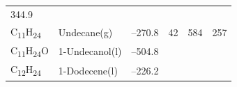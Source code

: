 \documentclass[
  9pt,
]{extbook}
\theoremstyle{definition}
\theoremstyle{definition}
\theoremstyle{definition}
\theoremstyle{remark}
\begin{document}
\begin{longtable}[]{@{}llllll@{}}
\begin{minipage}[t]{0.14\columnwidth}
344.9\strut
\end{minipage}\tabularnewline
\begin{minipage}[t]{0.07\columnwidth}\raggedright
C\textsubscript{11}H\textsubscript{24}\strut
\end{minipage} & \begin{minipage}[t]{0.17\columnwidth}\raggedright
Undecane(g)\strut
\end{minipage} & \begin{minipage}[t]{0.15\columnwidth}\raggedright
--270.8\strut
\end{minipage} & \begin{minipage}[t]{0.15\columnwidth}\raggedright
42\strut
\end{minipage} & \begin{minipage}[t]{0.14\columnwidth}\raggedright
584\strut
\end{minipage} & \begin{minipage}[t]{0.14\columnwidth}\raggedright
257\strut
\end{minipage}\tabularnewline
\begin{minipage}[t]{0.07\columnwidth}\raggedright
C\textsubscript{11}H\textsubscript{24}O\strut
\end{minipage} & \begin{minipage}[t]{0.17\columnwidth}\raggedright
1-Undecanol(l)\strut
\end{minipage} & \begin{minipage}[t]{0.15\columnwidth}\raggedright
--504.8\strut
\end{minipage} & \begin{minipage}[t]{0.15\columnwidth}\raggedright
\strut
\end{minipage} & \begin{minipage}[t]{0.14\columnwidth}\raggedright
\strut
\end{minipage} & \begin{minipage}[t]{0.14\columnwidth}\raggedright
\strut
\end{minipage}\tabularnewline
\begin{minipage}[t]{0.07\columnwidth}\raggedright
C\textsubscript{12}H\textsubscript{24}\strut
\end{minipage} & \begin{minipage}[t]{0.17\columnwidth}\raggedright
1-Dodecene(l)\strut
\end{minipage} & \begin{minipage}[t]{0.15\columnwidth}\raggedright
--226.2\strut
\end{minipage} & \begin{minipage}[t]{0.15\columnwidth}\raggedright

\end{minipage}
\end{longtable}
\end{document}
